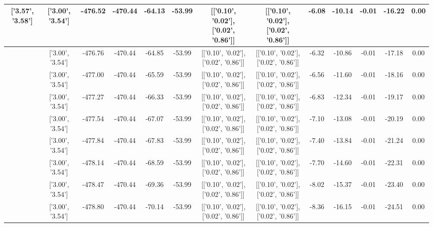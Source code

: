 \begin{table}[htbp]
\begin{adjustbox}{angle=90}
\begin{tabular}{|c|c|c|c|c|c|c|c|c|c|c|c|c|}
 ['3.57', '3.58'] & ['3.00', '3.54'] & -476.52 & -470.44 & -64.13 & -53.99 & [['0.10', '0.02'], ['0.02', '0.86']] & [['0.10', '0.02'], ['0.02', '0.86']] & -6.08 & -10.14 & -0.01 & -16.22 & 0.00\\ \hline
 ['3.61', '3.58'] & ['3.00', '3.54'] & -476.76 & -470.44 & -64.85 & -53.99 & [['0.10', '0.02'], ['0.02', '0.86']] & [['0.10', '0.02'], ['0.02', '0.86']] & -6.32 & -10.86 & -0.01 & -17.18 & 0.00\\ \hline
 ['3.65', '3.58'] & ['3.00', '3.54'] & -477.00 & -470.44 & -65.59 & -53.99 & [['0.10', '0.02'], ['0.02', '0.86']] & [['0.10', '0.02'], ['0.02', '0.86']] & -6.56 & -11.60 & -0.01 & -18.16 & 0.00\\ \hline
 ['3.69', '3.59'] & ['3.00', '3.54'] & -477.27 & -470.44 & -66.33 & -53.99 & [['0.10', '0.02'], ['0.02', '0.86']] & [['0.10', '0.02'], ['0.02', '0.86']] & -6.83 & -12.34 & -0.01 & -19.17 & 0.00\\ \hline
 ['3.72', '3.59'] & ['3.00', '3.54'] & -477.54 & -470.44 & -67.07 & -53.99 & [['0.10', '0.02'], ['0.02', '0.86']] & [['0.10', '0.02'], ['0.02', '0.86']] & -7.10 & -13.08 & -0.01 & -20.19 & 0.00\\ \hline
 ['3.76', '3.59'] & ['3.00', '3.54'] & -477.84 & -470.44 & -67.83 & -53.99 & [['0.10', '0.02'], ['0.02', '0.86']] & [['0.10', '0.02'], ['0.02', '0.86']] & -7.40 & -13.84 & -0.01 & -21.24 & 0.00\\ \hline
 ['3.80', '3.59'] & ['3.00', '3.54'] & -478.14 & -470.44 & -68.59 & -53.99 & [['0.10', '0.02'], ['0.02', '0.86']] & [['0.10', '0.02'], ['0.02', '0.86']] & -7.70 & -14.60 & -0.01 & -22.31 & 0.00\\ \hline
 ['3.84', '3.60'] & ['3.00', '3.54'] & -478.47 & -470.44 & -69.36 & -53.99 & [['0.10', '0.02'], ['0.02', '0.86']] & [['0.10', '0.02'], ['0.02', '0.86']] & -8.02 & -15.37 & -0.01 & -23.40 & 0.00\\ \hline
 ['3.88', '3.60'] & ['3.00', '3.54'] & -478.80 & -470.44 & -70.14 & -53.99 & [['0.10', '0.02'], ['0.02', '0.86']] & [['0.10', '0.02'], ['0.02', '0.86']] & -8.36 & -16.15 & -0.01 & -24.51 & 0.00\\ \hline
            \end{tabular}
        \end{adjustbox}
        \caption{}
        \label{}
    \end{table}
    